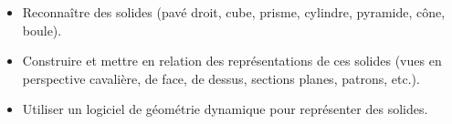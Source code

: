 \begin{prerequis}[Objectifs de 4\up{e}]    
    \begin{itemize}        
        \item Reconnaître des solides (pavé droit, cube, prisme, cylindre, pyramide, cône, boule).
        \item Construire et mettre en relation des représentations de ces solides (vues en perspective cavalière, de face, de dessus, sections planes, patrons, etc.).
        \columnbreak
        \item Utiliser un logiciel de géométrie dynamique pour représenter des solides.
    \end{itemize}
\end{prerequis}
